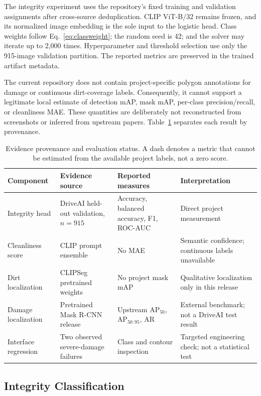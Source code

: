 \documentclass[conference]{IEEEtran}
\begin{document}
The integrity experiment uses the repository's fixed training and validation assignments after cross-source deduplication. CLIP ViT-B/32 remains frozen, and its normalized image embedding is the sole input to the logistic head. Class weights follow Eq.~\eqref{eq:classweight}; the random seed is 42; and the solver may iterate up to 2,000 times. Hyperparameter and threshold selection use only the 915-image validation partition. The reported metrics are preserved in the trained artifact metadata.

The current repository does not contain project-specific polygon annotations for damage or continuous dirt-coverage labels. Consequently, it cannot support a legitimate local estimate of detection mAP, mask mAP, per-class precision/recall, or cleanliness MAE. These quantities are deliberately not reconstructed from screenshots or inferred from upstream papers. Table~\ref{tab:evidence} separates each result by provenance.

\begin{table}[htbp]
\caption{Evidence provenance and evaluation status. A dash denotes a metric that cannot be estimated from the available project labels, not a zero score.}
\label{tab:evidence}
\centering
\small
\begin{tabular}{p{}p{}p{}p{}}
\toprule
Component & Evidence source & Reported measures & Interpretation \\
\midrule
Integrity head & DriveAI held-out validation, $n=915$ & Accuracy, balanced accuracy, F1, ROC-AUC & Direct project measurement \\
Cleanliness score & CLIP prompt ensemble & No MAE & Semantic confidence; continuous labels unavailable \\
Dirt localization & CLIPSeg pretrained weights & No project mask mAP & Qualitative localization only in this release \\
Damage localization & Pretrained Mask R-CNN release & Upstream AP$_{50}$, AP$_{50:95}$, AR & External benchmark; not a DriveAI test result \\
Interface regression & Two observed severe-damage failures & Class and contour inspection & Targeted engineering check; not a statistical test \\
\bottomrule
\end{tabular}
\end{table}

\subsection{Integrity Classification}
\end{document}
